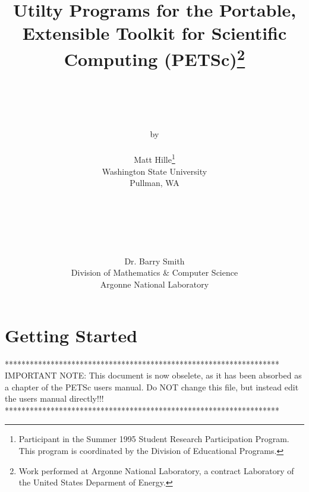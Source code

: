 

\def\note{\medskip \noindent Note:\begin{em}}
\def\endnote{\end{em} \medskip}






\begin{titlepage}

\title{Utilty Programs for the Portable, Extensible Toolkit for Scientific
	Computing (PETSc)\thanks{Work performed at Argonne National
	Laboratory, a contract Laboratory of the United States Deparment of
	Energy.}}

\author{\\ \\ \\ \\ by \\ \\ Matt Hille\thanks{Participant in the Summer 1995 Student
   Research Participation Program.  This program is coordinated by the 
   Division of Educational Programs.} \\ Washington State University \\ 
   Pullman, WA \\ \\ \\
\and
   \\ \\ \\ Dr. Barry Smith \\ Division of Mathematics \& Computer Science \\
   Argonne National Laboratory}

\end{titlepage}
\maketitle

\newpage 

\tableofcontents

\newpage
\section{Getting Started}

******************************************************************
IMPORTANT NOTE: This document is now obselete, as it has been absorbed
as a chapter of the PETSc users manual.  Do NOT change this file, but
instead edit the users manual directly!!!
******************************************************************



